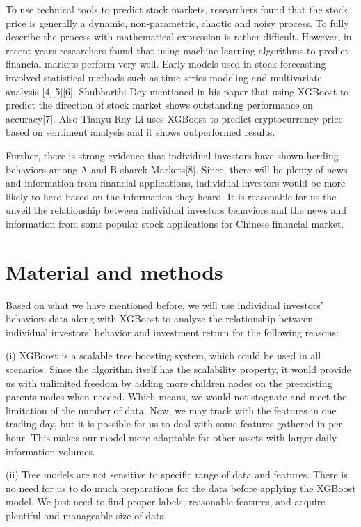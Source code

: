 \documentclass[letterpaper]{article}
\begin{document}
To use technical tools to predict stock markets, researchers found that the stock price is generally a dynamic, non-parametric, chaotic and noisy process. To fully describe the process with mathematical expression is rather difficult. However, in recent years researchers found that using machine learning algorithms to predict financial markets perform very well. Early models used in stock forecasting involved statistical methods such as time series modeling and multivariate analysis [4][5][6]. Shubharthi Dey mentioned in his paper that using XGBoost to predict the direction of stock market shows outstanding performance on accuracy[7]. Also Tianyu Ray Li uses XGBoost to predict cryptocurrency price based on sentiment analysis and it shows outperformed results.

Further, there is strong evidence that individual investors have shown herding behaviors among A and B-sharek Markets[8]. Since, there will be plenty of news and information from financial applications, individual investors would be more likely to herd based on the information they heard. It is reasonable for us the unveil the relationship between individual investors behaviors and the news and information from some popular stock applications for Chinese financial market. 


\section{Material and methods}
\label{material_method}
Based on what we have mentioned before, we will use individual investors' behaviors data along with XGBoost to analyze the relationship between individual investors’ behavior and investment return for the following reasons:

(i) XGBoost is a scalable tree boosting system, which could be used in all scenarios. Since the algorithm itself has the scalability property, it would provide us with unlimited freedom by adding more children nodes on the preexisting parents nodes when needed. Which means, we would not stagnate and meet the limitation of the number of data. Now, we may track with the features in one trading day, but it is possible for us to deal with some features gathered in per hour. This makes our model more adaptable for other assets with larger daily information volumes. 

(ii) Tree models are not sensitive to specific range of data and features. There is no need for us to do much preparations for the data before applying the XGBoost model. We just need to find proper labels, reasonable features, and acquire plentiful and manageable size of data. 
\end{document}
